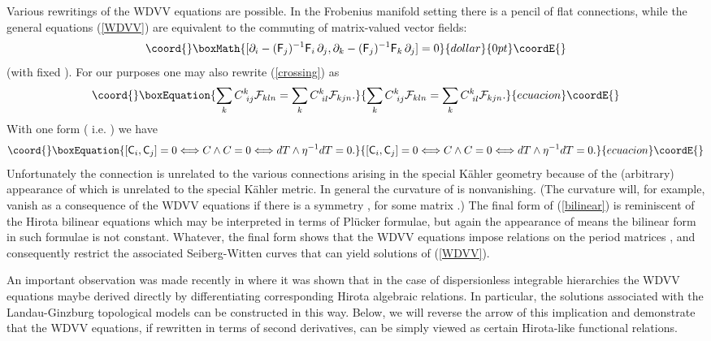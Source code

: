 \documentclass[a4paper,]{article}
\def\d{\partial}
\def\F{{\cal F}}
\def\f{{\sf F}}
\def\C{{\sf C}}
\begin{document}
Various rewritings of the WDVV equations are possible.
In the Frobenius manifold setting there is a pencil of flat connections,
while the general equations (\ref{WDVV}) are equivalent \cite{mor} to
the commuting of matrix-valued vector fields:
$$\coord{}\boxMath{[\d_i -(\f_j)\sp{-1}\f_i\, \d_j,
   \d_k -(\f_j)\sp{-1}\f_k\, \d_j]=0}{dollar}{0pt}\coordE{}$$
(with fixed \coordHE{}).
For our purposes one may also rewrite (\ref{crossing}) as
\begin{equation}\coord{}\boxEquation{
\label{crossF}
\sum_k C^k_{\ ij}\F_{kln} = \sum_k C^k_{\ il}\F_{kjn}.
}{
\sum_k C^k_{\ ij}\F_{kln} = \sum_k C^k_{\ il}\F_{kjn}.
}{ecuacion}\coordE{}\end{equation}
With one form \coordHE{} (
i.e. \myHighlight{$C_{\ ij}^k da\sp{i}= \eta^{kl}\d_i T_{jl}da\sp{i}=
\eta^{kl}\F_{ijl}da\sp{i}$}\coordHE{}) we have
\begin{equation}\coord{}\boxEquation{
\label{bilinear}
[\C_i, \C_j ]=0\Longleftrightarrow C\wedge C=0
\Longleftrightarrow dT\wedge \eta\sp{-1}dT=0.
}{
[\C_i, \C_j ]=0\Longleftrightarrow C\wedge C=0
\Longleftrightarrow dT\wedge \eta\sp{-1}dT=0.
}{ecuacion}\coordE{}\end{equation}
Unfortunately the connection \coordHE{} is unrelated to the various connections
arising in the special K\"ahler geometry because of the (arbitrary)
appearance of \myHighlight{$\eta$}\coordHE{} which is unrelated to the special K\"ahler metric.
In general the curvature of \coordHE{} is nonvanishing.
(The curvature will, for example, vanish as a consequence of the
WDVV equations if there is a symmetry \coordHE{}, for
some matrix \myHighlight{$\mu$}\coordHE{}.)
The final form of (\ref{bilinear}) is reminiscent of the Hirota
bilinear equations which may be interpreted in terms of Pl\"ucker
formulae, but again the appearance of \myHighlight{$\eta$}\coordHE{} means the bilinear form
in such formulae is not constant.
Whatever, the final form shows that the WDVV equations impose relations
on the period matrices \coordHE{}, and consequently restrict the associated 
Seiberg-Witten curves that can yield solutions of (\ref{WDVV}).

An important observation was made recently in \cite{BMRWZ} where it was shown
that in the case of dispersionless integrable hierarchies the WDVV
equations maybe derived directly by differentiating corresponding Hirota
algebraic relations. In particular, the solutions associated with
the Landau-Ginzburg topological models can be constructed in this way.
Below, we will reverse the arrow of this implication 
and demonstrate that the WDVV equations, if rewritten in terms of second
derivatives, can be simply viewed as certain Hirota-like
functional relations.
\end{document}
